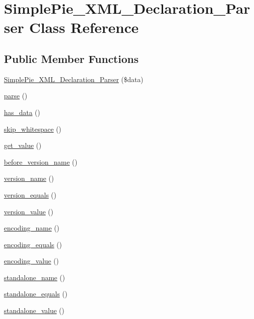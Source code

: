 \hypertarget{class_simple_pie___x_m_l___declaration___parser}{\section{Simple\-Pie\-\_\-\-X\-M\-L\-\_\-\-Declaration\-\_\-\-Parser Class Reference}
\label{class_simple_pie___x_m_l___declaration___parser}
}
\subsection*{Public Member Functions}
\begin{DoxyCompactItemize}
\item 
\hyperlink{class_simple_pie___x_m_l___declaration___parser_a849cfd0256c93eb6ce32d22bd80e3097}{Simple\-Pie\-\_\-\-X\-M\-L\-\_\-\-Declaration\-\_\-\-Parser} (\$data)
\item 
\hyperlink{class_simple_pie___x_m_l___declaration___parser_ac1bfaf0d73c166138869501315a0545a}{parse} ()
\item 
\hyperlink{class_simple_pie___x_m_l___declaration___parser_a84536dfda27fde0daa7d4879e52a0cd2}{has\-\_\-data} ()
\item 
\hyperlink{class_simple_pie___x_m_l___declaration___parser_ac6b17bf6c08e6c15cb9b5db94fec46bd}{skip\-\_\-whitespace} ()
\item 
\hyperlink{class_simple_pie___x_m_l___declaration___parser_ac42a3da7e47239dcb7b1255b3affef12}{get\-\_\-value} ()
\item 
\hyperlink{class_simple_pie___x_m_l___declaration___parser_a78ff37588dfa85befef96ade2df22093}{before\-\_\-version\-\_\-name} ()
\item 
\hyperlink{class_simple_pie___x_m_l___declaration___parser_add95af66b54726446df41cc5a88e2aba}{version\-\_\-name} ()
\item 
\hyperlink{class_simple_pie___x_m_l___declaration___parser_aeb725cfba090b36c4d027c7712cdab30}{version\-\_\-equals} ()
\item 
\hyperlink{class_simple_pie___x_m_l___declaration___parser_aeb999f0c3d1c5748d30543d683264b9e}{version\-\_\-value} ()
\item 
\hyperlink{class_simple_pie___x_m_l___declaration___parser_ad443682f426e54a28e0f389a62a0d7fe}{encoding\-\_\-name} ()
\item 
\hyperlink{class_simple_pie___x_m_l___declaration___parser_ac3c152d84774ed354bfc49d64aaac4d1}{encoding\-\_\-equals} ()
\item 
\hyperlink{class_simple_pie___x_m_l___declaration___parser_a912dee447377a620677c2331efe9b5ed}{encoding\-\_\-value} ()
\item 
\hyperlink{class_simple_pie___x_m_l___declaration___parser_aa7e97155d60cde3886ace2b3d6e33c3f}{standalone\-\_\-name} ()
\item 
\hyperlink{class_simple_pie___x_m_l___declaration___parser_a1ddb41358b625a6963a4423066443aee}{standalone\-\_\-equals} ()
\item 
\hyperlink{class_simple_pie___x_m_l___declaration___parser_aa6e6423d2f1f3ba8d46ab29d452cccf4}{standalone\-\_\-value} ()
\end{DoxyCompactItemize}

